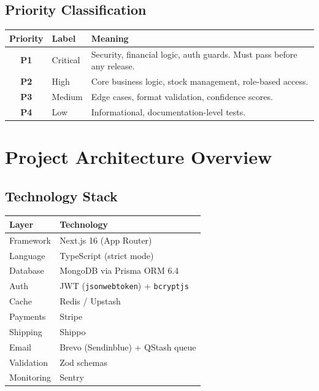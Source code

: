 \documentclass[12pt,a4paper]{report}
\newcommand{\pone}{\textbf{\color{p1red}P1}}
\newcommand{\ptwo}{\textbf{\color{p2orange}P2}}
\newcommand{\pthree}{\textbf{\color{p3blue}P3}}
\newcommand{\pfour}{\textbf{\color{p4green}P4}}
\begin{document}
\section{Priority Classification}

\begin{center}
\begin{tabular}{clp{9cm}}
  \toprule
  \textbf{Priority} & \textbf{Label} & \textbf{Meaning} \\
  \midrule
  \pone & Critical & Security, financial logic, auth guards. Must pass before any release. \\
  \ptwo & High     & Core business logic, stock management, role-based access. \\
  \pthree & Medium & Edge cases, format validation, confidence scores. \\
  \pfour & Low     & Informational, documentation-level tests. \\
  \bottomrule
\end{tabular}
\end{center}

\chapter{Project Architecture Overview}

\section{Technology Stack}

\begin{center}
\begin{tabularx}{\textwidth}{lX}
  \toprule
  \textbf{Layer} & \textbf{Technology} \\
  \midrule
  Framework    & Next.js 16 (App Router) \\
  Language     & TypeScript (strict mode) \\
  Database     & MongoDB via Prisma ORM 6.4 \\
  Auth         & JWT (\texttt{jsonwebtoken}) + \texttt{bcryptjs} \\
  Cache        & Redis / Upstash \\
  Payments     & Stripe \\
  Shipping     & Shippo \\
  Email        & Brevo (Sendinblue) + QStash queue \\
  Validation   & Zod schemas \\
  Monitoring   & Sentry \\
  \bottomrule
\end{tabularx}
\end{center}
\end{document}
